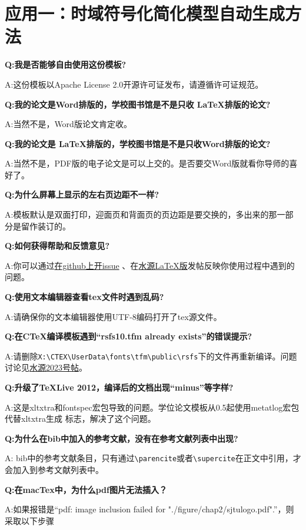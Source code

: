 \chapter{应用一：时域符号化简化模型自动生成方法}
\label{chap:time}

{\bfseries{}Q:我是否能够自由使用这份模板?}

A:这份模板以Apache License 2.0开源许可证发布，请遵循许可证规范。

{\bfseries{}Q:我的论文是Word排版的，学校图书馆是不是只收 \LaTeX 排版的论文?}

A:当然不是，Word版论文肯定收。

{\bfseries{}Q:我的论文是 \LaTeX 排版的，学校图书馆是不是只收Word排版的论文?}

A:当然不是，PDF版的电子论文是可以上交的。是否要交Word版就看你导师的喜好了。

{\bfseries{}Q:为什么屏幕上显示的左右页边距不一样?}

A:模板默认是双面打印，迎面页和背面页的页边距是要交换的，多出来的那一部分是留作装订的。

{\bfseries{}Q:如何获得帮助和反馈意见?}

A:你可以通过\href{https://github.com/weijianwen/sjtu-thesis-template-latex/issues}{在github上开issue}
、在\href{https://bbs.sjtu.edu.cn/bbsdoc?board=TeX_LaTeX}{水源LaTeX版}发帖反映你使用过程中遇到的问题。

{\bfseries{}Q:使用文本编辑器查看tex文件时遇到乱码?}

A:请确保你的文本编辑器使用UTF-8编码打开了tex源文件。

{\bfseries{}Q:在CTeX编译模板遇到“rsfs10.tfm already exists”的错误提示?}

A:请删除\verb+X:\CTEX\UserData\fonts\tfm\public\rsfs+下的文件再重新编译。问题讨论见\href{https://bbs.sjtu.edu.cn/bbstcon,board,TeX_LaTeX,reid,1352982719.html}{水源2023号帖}。

{\bfseries{}Q:升级了TeXLive 2012，编译后的文档出现“minus”等字样?}

A:这是xltxtra和fontspec宏包导致的问题。学位论文模板从0.5起使用metatlog宏包代替xltxtra生成 \XeTeX 标志，解决了这个问题。

{\bfseries{}Q:为什么在bib中加入的参考文献，没有在参考文献列表中出现?}

A: bib中的参考文献条目，只有通过\verb+\parencite+或者\verb+\supercite+在正文中引用，才会加入到参考文献列表中。

{\bfseries{}Q:在macTex中，为什么pdf图片无法插入？}

A:如果报错是“pdf: image inclusion failed for "./figure/chap2/sjtulogo.pdf".”，则采取以下步骤

